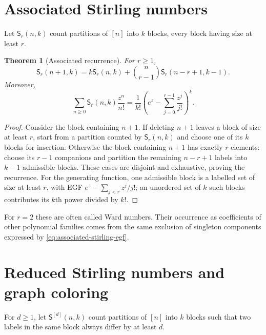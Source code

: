 \documentclass[11pt,a4paper,oneside,openany]{book}
\newtheorem{theorem}{Theorem}[chapter]
\theoremstyle{definition}
\theoremstyle{remark}
\begin{document}
\section{Associated Stirling numbers}
Let $\mathsf S_r(n,k)$ count partitions of $[n]$ into $k$ blocks, every block having
size at least $r$.

\begin{theorem}[Associated recurrence]
\label{thm:associated-stirling-recurrence}
For $r\ge1$,
\begin{equation}
\label{eq:associated-stirling-recurrence}
 \mathsf S_r(n+1,k)
 =k\mathsf S_r(n,k)+\binom n{r-1}\mathsf S_r(n-r+1,k-1).
\end{equation}
Moreover,
\begin{equation}
\label{eq:associated-stirling-egf}
 \sum_{n\ge0}\mathsf S_r(n,k)\frac{z^n}{n!}
 =\frac1{k!}\left(e^z-\sum_{j=0}^{r-1}\frac{z^j}{j!}\right)^k.
\end{equation}
\end{theorem}
\begin{proof}
Consider the block containing $n+1$.  If deleting $n+1$ leaves a block of size at
least $r$, start from a partition counted by $\mathsf S_r(n,k)$ and choose one of
its $k$ blocks for insertion.  Otherwise the block containing $n+1$ has exactly
$r$ elements: choose its $r-1$ companions and partition the remaining $n-r+1$
labels into $k-1$ admissible blocks.  These cases are disjoint and exhaustive,
proving the recurrence.  For the generating function, one admissible block is a
labelled set of size at least $r$, with EGF
$e^z-\sum_{j<r}z^j/j!$; an unordered set of $k$ such blocks contributes its $k$th
power divided by $k!$.
\end{proof}

For $r=2$ these are often called Ward numbers.  Their occurrence as coefficients
of other polynomial families comes from the same exclusion of singleton
components expressed by \eqref{eq:associated-stirling-egf}.

\section{Reduced Stirling numbers and graph coloring}
For $d\ge1$, let $\mathsf S^{[d]}(n,k)$ count partitions of $[n]$ into $k$ blocks
such that two labels in the same block always differ by at least $d$.
\end{document}
